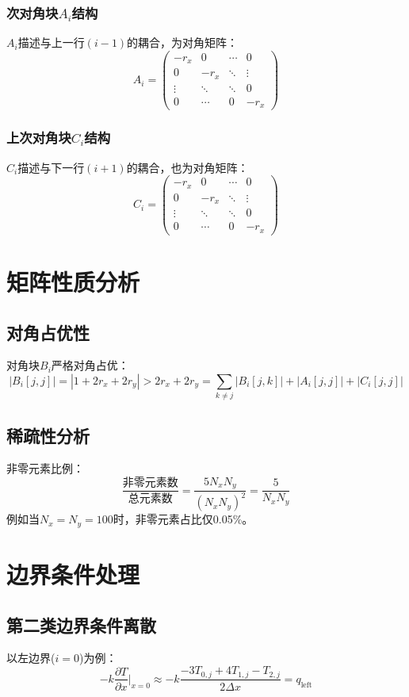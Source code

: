 \documentclass{ctexart}
\begin{document}
\subsubsection{次对角块$A_i$结构}
$A_i$描述与上一行$(i-1)$的耦合，为对角矩阵：
$$
A_i = \begin{pmatrix}
-r_x & 0 & \cdots & 0 \\
0 & -r_x & \ddots & \vdots \\
\vdots & \ddots & \ddots & 0 \\
0 & \cdots & 0 & -r_x
\end{pmatrix}
$$

\subsubsection{上次对角块$C_i$结构}
$C_i$描述与下一行$(i+1)$的耦合，也为对角矩阵：
$$
C_i = \begin{pmatrix}
-r_x & 0 & \cdots & 0 \\
0 & -r_x & \ddots & \vdots \\
\vdots & \ddots & \ddots & 0 \\
0 & \cdots & 0 & -r_x
\end{pmatrix}
$$

\section{矩阵性质分析}

\subsection{对角占优性}
对角块$B_i$严格对角占优：
$$
|B_i[j,j]| = |1+2r_x+2r_y| > 2r_x + 2r_y = \sum_{k \neq j} |B_i[j,k]| + |A_i[j,j]| + |C_i[j,j]|
$$

\subsection{稀疏性分析}
非零元素比例：
$$
\frac{\text{非零元素数}}{\text{总元素数}} = \frac{5N_xN_y}{(N_xN_y)^2} = \frac{5}{N_xN_y}
$$
例如当$N_x = N_y = 100$时，非零元素占比仅0.05\%。

\section{边界条件处理}

\subsection{第二类边界条件离散}
以左边界($i=0$)为例：
$$
-k \frac{\partial T}{\partial x}\bigg|_{x=0} \approx -k \frac{-3T_{0,j} + 4T_{1,j} - T_{2,j}}{2\Delta x} = q_{\text{left}}
$$
\end{document}
